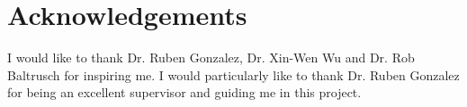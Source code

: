 \makeatletter
\chapter{Acknowledgements}

I would like to thank Dr. Ruben Gonzalez, Dr. Xin-Wen Wu and Dr. Rob Baltrusch for inspiring me. I would particularly like to thank Dr. Ruben Gonzalez for being an excellent supervisor and guiding me in this project.